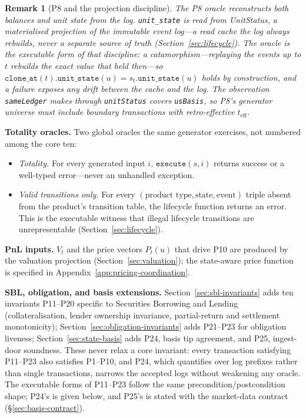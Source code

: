 \documentclass[11pt,a4paper]{article}
\newtheorem{remark}[definition]{Remark}
\begin{document}
\begin{remark}[P8 and the projection discipline]
The P8 oracle reconstructs \emph{both} balances and unit state from the log. \texttt{unit\_state} is read from UnitStatus, a materialised projection of the immutable event log---a read cache the log always rebuilds, never a separate source of truth (Section~\ref{sec:lifecycle}). The oracle is the executable form of that discipline: a catamorphism---replaying the events up to $t$ rebuilds the exact value that held then---so $\texttt{clone\_at}(t).\texttt{unit\_state}(u)=s_t.\texttt{unit\_state}(u)$ holds by construction, and a failure exposes any drift between the cache and the log. The observation \texttt{sameLedger} makes through \texttt{unitStatus} covers \texttt{usBasis}, so P8's generator universe must include boundary transactions with retro-effective $t_{\mathrm{eff}}$.
\end{remark}

\noindent\textbf{Totality oracles.} Two global oracles the same generator exercises, not numbered among the core ten:
\begin{itemize}
\item \emph{Totality.} For every generated input $i$, $\texttt{execute}(s,i)$ returns success or a well-typed error---never an unhandled exception.
\item \emph{Valid transitions only.} For every $(\text{product type},\text{state},\text{event})$ triple absent from the product's transition table, the lifecycle function returns an error. This is the executable witness that illegal lifecycle transitions are unrepresentable (Section~\ref{sec:lifecycle}).
\end{itemize}

\noindent\textbf{PnL inputs.} $V_t$ and the price vectors $P_t(u)$ that drive P10 are produced by the valuation projection (Section~\ref{sec:valuation}); the state-aware price function is specified in Appendix~\ref{app:pricing-coordination}.

\noindent\textbf{SBL, obligation, and basis extensions.} Section~\ref{sec:sbl-invariants} adds ten invariants P11--P20 specific to Securities Borrowing and Lending (collateralisation, lender ownership invariance, partial-return and settlement monotonicity); Section~\ref{sec:obligation-invariants} adds P21--P23 for obligation liveness; Section~\ref{sec:state-basis} adds P24, basis tip agreement, and P25, ingest-door soundness. These never relax a core invariant: every transaction satisfying P11--P23 also satisfies P1--P10, and P24, which quantifies over log prefixes rather than single transactions, narrows the accepted logs without weakening any oracle. The executable forms of P11--P23 follow the same precondition/postcondition shape; P24's is given below, and P25's is stated with the market-data contract (\S\ref{sec:basis-contract}).
\end{document}
